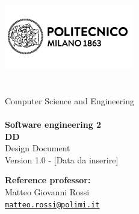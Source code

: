 \makeatletter
\begin{titlepage}
	\begin{center} 
		\includegraphics{dd/resources/images/logo_polimi.png}\\[4ex]
		{\Huge \bfseries \sffamily \@title }\\[4ex] 
		{\Large  \@author}\\[2ex] 
		Computer Science and Engineering\\[5ex]
		\@date\\[5ex]
		\begingroup
            \fontsize{15pt}{12pt}\selectfont
            \textbf{Software engineering 2}
        \endgroup\\[3ex]
        \begingroup
            \fontsize{20pt}{12pt}\selectfont
            \textbf{DD}\\[1ex]
            \fontsize{15pt}{12pt}\selectfont
            Design Document
        \endgroup\\[8ex]
	    Version 1.0 - [Data da inserire]
	\end{center}
	
	\vspace*{\fill}
	\begin{flushright}
	    \textbf{Reference professor:}\\[0.2cm]
	    Matteo Giovanni Rossi\\[0cm]
        {\small \href{mailto:matteo.rossi@polimi.it}{\texttt{matteo.rossi@polimi.it}}}
	\end{flushright}
\end{titlepage}
\makeatother
\thispagestyle{empty}
\setcounter{page}{1} %